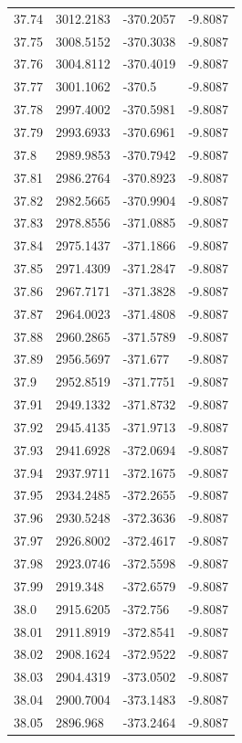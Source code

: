 \begin{table}[H]
\begin{tabular}{llll}
37.74 & 3012.2183 & -370.2057 & -9.8087 \\
37.75 & 3008.5152 & -370.3038 & -9.8087 \\
37.76 & 3004.8112 & -370.4019 & -9.8087 \\
37.77 & 3001.1062 & -370.5 & -9.8087 \\
37.78 & 2997.4002 & -370.5981 & -9.8087 \\
37.79 & 2993.6933 & -370.6961 & -9.8087 \\
37.8 & 2989.9853 & -370.7942 & -9.8087 \\
37.81 & 2986.2764 & -370.8923 & -9.8087 \\
37.82 & 2982.5665 & -370.9904 & -9.8087 \\
37.83 & 2978.8556 & -371.0885 & -9.8087 \\
37.84 & 2975.1437 & -371.1866 & -9.8087 \\
37.85 & 2971.4309 & -371.2847 & -9.8087 \\
37.86 & 2967.7171 & -371.3828 & -9.8087 \\
37.87 & 2964.0023 & -371.4808 & -9.8087 \\
37.88 & 2960.2865 & -371.5789 & -9.8087 \\
37.89 & 2956.5697 & -371.677 & -9.8087 \\
37.9 & 2952.8519 & -371.7751 & -9.8087 \\
37.91 & 2949.1332 & -371.8732 & -9.8087 \\
37.92 & 2945.4135 & -371.9713 & -9.8087 \\
37.93 & 2941.6928 & -372.0694 & -9.8087 \\
37.94 & 2937.9711 & -372.1675 & -9.8087 \\
37.95 & 2934.2485 & -372.2655 & -9.8087 \\
37.96 & 2930.5248 & -372.3636 & -9.8087 \\
37.97 & 2926.8002 & -372.4617 & -9.8087 \\
37.98 & 2923.0746 & -372.5598 & -9.8087 \\
37.99 & 2919.348 & -372.6579 & -9.8087 \\
38.0 & 2915.6205 & -372.756 & -9.8087 \\
38.01 & 2911.8919 & -372.8541 & -9.8087 \\
38.02 & 2908.1624 & -372.9522 & -9.8087 \\
38.03 & 2904.4319 & -373.0502 & -9.8087 \\
38.04 & 2900.7004 & -373.1483 & -9.8087 \\
38.05 & 2896.968 & -373.2464 & -9.8087 \\

\end{tabular}
\end{table}
